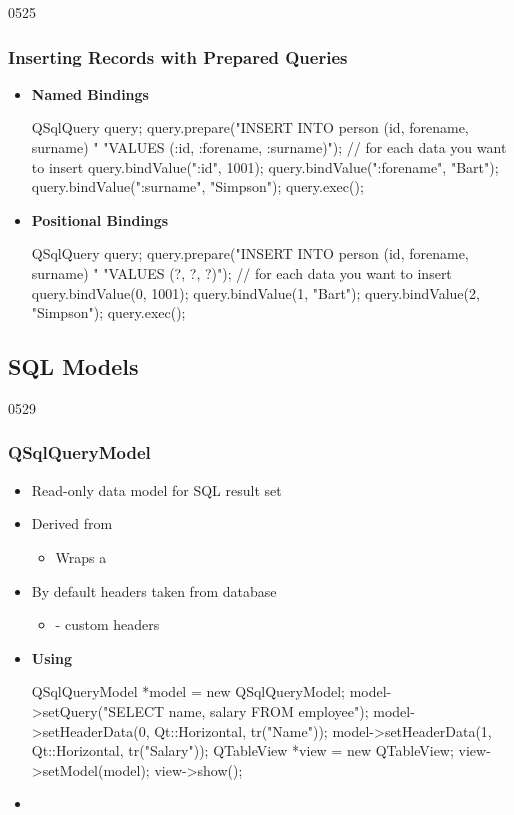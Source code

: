 \begin{slide}[fragile]{0525}\frametitle{Inserting Records with Prepared Queries}
\begin{itemize}
\item \textbf{Named Bindings}
  \begin{cpp}
QSqlQuery query;
query.prepare("INSERT INTO person (id, forename, surname) "
              "VALUES (:id, :forename, :surname)");
// for each data you want to insert
    query.bindValue(":id", 1001);
    query.bindValue(":forename", "Bart");
    query.bindValue(":surname", "Simpson");
    query.exec();  
\end{cpp}
\item \textbf{Positional Bindings}
  \begin{cpp}
QSqlQuery query;
query.prepare("INSERT INTO person (id, forename, surname) "
              "VALUES (?, ?, ?)");
// for each data you want to insert
    query.bindValue(0, 1001);
    query.bindValue(1, "Bart");
    query.bindValue(2, "Simpson");
    query.exec();
  \end{cpp}
\end{itemize}
\end{slide}

\subsection{SQL Models}

\begin{slide}[fragile]{0529}\frametitle{QSqlQueryModel}
\begin{itemize}
\item Read-only data model for SQL result set
\item Derived from 
  \begin{itemize}
  \item Wraps a 
  \end{itemize}
\item By default headers taken from database
  \begin{itemize}
  \item {} - custom headers
  \end{itemize}
\item \textbf{Using }
  \begin{cpp}
QSqlQueryModel *model = new QSqlQueryModel;
model->setQuery("SELECT name, salary FROM employee");
model->setHeaderData(0, Qt::Horizontal, tr("Name"));
model->setHeaderData(1, Qt::Horizontal, tr("Salary"));
QTableView *view = new QTableView;
view->setModel(model);
view->show();    
  \end{cpp}
\item {}
\end{itemize}
\end{slide}

